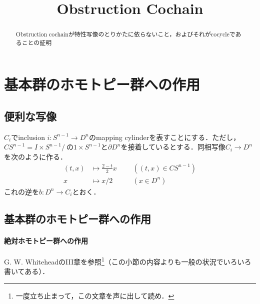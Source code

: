 \documentclass[a4paper,11pt]{jsarticle}
\theoremstyle{definition}
\begin{document}
\date{}
\title{Obstruction Cochain}

\maketitle

\begin{abstract}
  Obstruction cochainが特性写像のとりかたに依らないこと，およびそれがcocycleであることの証明
\end{abstract}
\tableofcontents
\section{基本群のホモトピー群への作用}
\subsection{便利な写像}
$C_i$でinclusion $i\colon S^{n-1}\to D^n$のmapping cylinderを表すことにする．ただし，$CS^{n-1}=I\times S^{n-1}/~$の$1\times S^{n-1}$と$\partial D^n$を接着しているとする．同相写像$C_i\to D^n$を次のように作る．\[
  \begin{alignedat}{2}
  (t,x)&\mapsto \frac{2-t}{2}x&\ \ \ &((t,x)\in CS^{n-1})\\
  x&\mapsto x/2&&(x\in D^n)
\end{alignedat}
\]これの逆を$b\colon D^n\to C_i$とおく．
\subsection{基本群のホモトピー群への作用}
\paragraph{絶対ホモトピー群への作用}
G. W. WhiteheadのIII章を参照\footnote{一度立ち止まって，この文章を声に出して読め．}（この小節の内容よりも一般の状況でいろいろ書いてある）．
\end{document}
